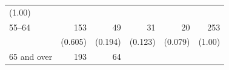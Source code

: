\documentclass[11pt,a4paper,openany]{book}
\begin{document}
\begin{longtable}[]{@{}lrrrrr@{}}
\begin{minipage}[t]{0.06\columnwidth}
(1.00)\strut
\end{minipage}\tabularnewline
\begin{minipage}[t]{0.10\columnwidth}\raggedright\strut
55--64\strut
\end{minipage} & \begin{minipage}[t]{0.40\columnwidth}\raggedleft\strut
153\strut
\end{minipage} & \begin{minipage}[t]{0.09\columnwidth}\raggedleft\strut
49\strut
\end{minipage} & \begin{minipage}[t]{0.09\columnwidth}\raggedleft\strut
31\strut
\end{minipage} & \begin{minipage}[t]{0.09\columnwidth}\raggedleft\strut
20\strut
\end{minipage} & \begin{minipage}[t]{0.06\columnwidth}\raggedleft\strut
253\strut
\end{minipage}\tabularnewline
\begin{minipage}[t]{0.10\columnwidth}\raggedright\strut
\strut
\end{minipage} & \begin{minipage}[t]{0.40\columnwidth}\raggedleft\strut
(0.605)\strut
\end{minipage} & \begin{minipage}[t]{0.09\columnwidth}\raggedleft\strut
(0.194)\strut
\end{minipage} & \begin{minipage}[t]{0.09\columnwidth}\raggedleft\strut
(0.123)\strut
\end{minipage} & \begin{minipage}[t]{0.09\columnwidth}\raggedleft\strut
(0.079)\strut
\end{minipage} & \begin{minipage}[t]{0.06\columnwidth}\raggedleft\strut
(1.00)\strut
\end{minipage}\tabularnewline
\begin{minipage}[t]{0.10\columnwidth}\raggedright\strut
65 and over\strut
\end{minipage} & \begin{minipage}[t]{0.40\columnwidth}\raggedleft\strut
193\strut
\end{minipage} & \begin{minipage}[t]{0.09\columnwidth}\raggedleft\strut
64\strut
\end{minipage} & \begin{minipage}[t]{0.09\columnwidth}\raggedleft\strut

\end{minipage}
\end{longtable}
\end{document}
